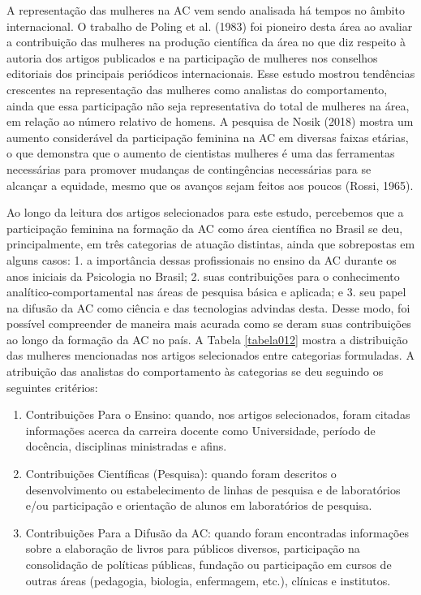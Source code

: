 A representação das mulheres na AC vem sendo analisada há tempos no âmbito internacional. O trabalho de Poling et al. (1983) foi pioneiro desta área ao avaliar a contribuição das mulheres na produção científica da área no que diz respeito à autoria dos artigos publicados e na participação de mulheres nos conselhos editoriais dos principais periódicos internacionais. Esse estudo mostrou tendências crescentes na representação das mulheres como analistas do comportamento, ainda que essa participação não seja representativa do total de mulheres na área, em relação ao número relativo de homens. A pesquisa de Nosik (2018) mostra um aumento considerável da participação feminina na AC em diversas faixas etárias, o que demonstra que o aumento de cientistas mulheres é uma das ferramentas necessárias para promover mudanças de contingências necessárias para se alcançar a equidade, mesmo que os avanços sejam feitos aos poucos (Rossi, 1965).

Ao longo da leitura dos artigos selecionados para este estudo, percebemos que a participação feminina na formação da AC como área científica no Brasil se deu, principalmente, em três categorias de atuação distintas, ainda que sobrepostas em alguns casos: 1. a importância dessas profissionais no ensino da AC durante os anos iniciais da Psicologia no Brasil; 2. suas contribuições para o conhecimento analítico-comportamental nas áreas de pesquisa básica e aplicada; e 3. seu papel na difusão da AC como ciência e das tecnologias advindas desta. Desse modo, foi possível compreender de maneira mais acurada como se deram suas contribuições ao longo da formação da AC no país. A Tabela \ref{tabela012} mostra a distribuição das mulheres mencionadas nos artigos selecionados entre categorias formuladas. A atribuição das analistas do comportamento às categorias se deu seguindo os seguintes critérios:

\begin{enumerate}[1. ]
\item Contribuições Para o Ensino: quando, nos artigos selecionados, foram citadas informações acerca da carreira docente como Universidade, período de docência, disciplinas ministradas e afins.

\item Contribuições Científicas (Pesquisa): quando foram descritos o desenvolvimento ou estabelecimento de linhas de pesquisa e de laboratórios e/ou participação e orientação de alunos em laboratórios de pesquisa.

\item Contribuições Para a Difusão da AC: quando foram encontradas informações sobre a elaboração de livros para públicos diversos, participação na consolidação de políticas públicas, fundação ou participação em cursos de outras áreas (pedagogia, biologia, enfermagem, etc.), clínicas e institutos.
\end{enumerate}

